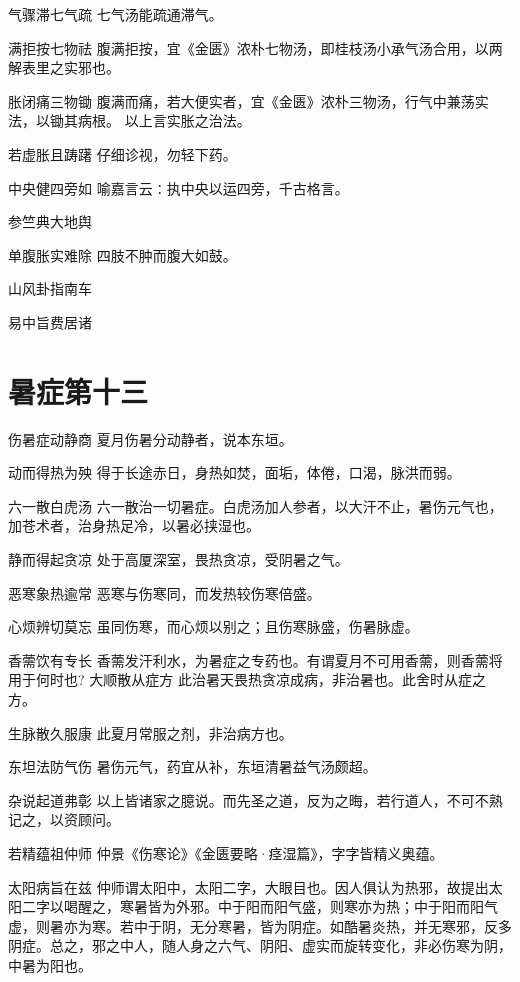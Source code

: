 \documentclass[a4paper,12pt,UTF8,twoside]{ctexbook}
\begin{document}
    气骤滞七气疏
    七气汤能疏通滞气。
    
    满拒按七物祛
    腹满拒按，宜《金匮》浓朴七物汤，即桂枝汤小承气汤合用，以两解表里之实邪也。
    
    胀闭痛三物锄
    腹满而痛，若大便实者，宜《金匮》浓朴三物汤，行气中兼荡实法，以锄其病根。
    以上言实胀之治法。
    
    若虚胀且踌躇
    仔细诊视，勿轻下药。
    
    中央健四旁如
    喻嘉言云∶执中央以运四旁，千古格言。
    
    参竺典大地舆
    
    单腹胀实难除
    四肢不肿而腹大如鼓。
    
    山风卦指南车
    
    易中旨费居诸
    
    \chapter{暑症第十三}
    
    伤暑症动静商
    夏月伤暑分动静者，说本东垣。
    
    动而得热为殃
    得于长途赤日，身热如焚，面垢，体倦，口渴，脉洪而弱。
    
    六一散白虎汤
    六一散治一切暑症。白虎汤加人参者，以大汗不止，暑伤元气也，加苍术者，治身热足冷，以暑必挟湿也。
    
    静而得起贪凉
    处于高厦深室，畏热贪凉，受阴暑之气。
    
    恶寒象热逾常
    恶寒与伤寒同，而发热较伤寒倍盛。
    
    心烦辨切莫忘
    虽同伤寒，而心烦以别之；且伤寒脉盛，伤暑脉虚。
    
    香薷饮有专长
    香薷发汗利水，为暑症之专药也。有谓夏月不可用香薷，则香薷将用于何时也?
    大顺散从症方
    此治暑天畏热贪凉成病，非治暑也。此舍时从症之方。
    
    生脉散久服康
    此夏月常服之剂，非治病方也。
    
    东坦法防气伤
    暑伤元气，药宜从补，东垣清暑益气汤颇超。
    
    杂说起道弗彰
    以上皆诸家之臆说。而先圣之道，反为之晦，若行道人，不可不熟记之，以资顾问。
    
    若精蕴祖仲师
    仲景《伤寒论》《金匮要略·痉湿篇》，字字皆精义奥蕴。
    
    太阳病旨在兹
    仲师谓太阳中，太阳二字，大眼目也。因人俱认为热邪，故提出太阳二字以喝醒之，寒暑皆为外邪。中于阳而阳气盛，则寒亦为热；中于阳而阳气虚，则暑亦为寒。若中于阴，无分寒暑，皆为阴症。如酷暑炎热，并无寒邪，反多阴症。总之，邪之中人，随人身之六气、阴阳、虚实而旋转变化，非必伤寒为阴，中暑为阳也。
    
\end{document}
